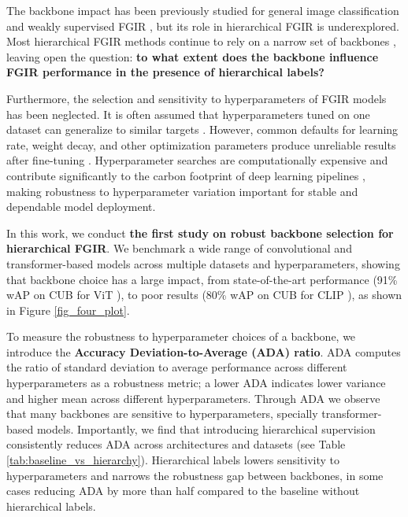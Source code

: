 \documentclass[conference]{IEEEtran}
\begin{document}


The backbone impact has been previously studied for general image classification \cite{kornblith_better_2019, goldblum_battle_2023, jeevan_which_2025} and weakly supervised FGIR \cite{ye_image_2024}, but its role in hierarchical FGIR is underexplored. Most hierarchical FGIR methods continue to rely on a narrow set of backbones \cite{wang_multiple_2015, cerri_reduction_2016, chen_fine-grained_2018, chang_your_2021, chen_label_2022, chen_hierarchically_2024}, leaving open the question: \textbf{to what extent does the backbone influence FGIR performance in the presence of hierarchical labels?}

Furthermore, the selection and sensitivity to hyperparameters of FGIR models has been neglected. It is often assumed that hyperparameters tuned on one dataset can generalize to similar targets \cite{ngiam_domain_2018}. However, common defaults for learning rate, weight decay, and other optimization parameters produce unreliable results after fine-tuning \cite{li_rethinking_2020}. Hyperparameter searches are computationally expensive and contribute significantly to the carbon footprint of deep learning pipelines \cite{strubell_energy_2019, lacoste_quantifying_2019}, making robustness to hyperparameter variation important for stable and dependable model deployment.

In this work, we conduct \textbf{the first study on robust backbone selection for hierarchical FGIR}. We benchmark a wide range of convolutional and transformer-based models across multiple datasets and hyperparameters, showing that backbone choice has a large impact, from state-of-the-art performance (91\% wAP on CUB for ViT \cite{dosovitskiy_image_2021}), to poor results (80\% wAP on CUB for CLIP \cite{cherti_reproducible_2023}), as shown in Figure \ref{fig_four_plot}. 

To measure the robustness to hyperparameter choices of a backbone, we introduce the \textbf{Accuracy Deviation-to-Average (ADA) ratio}. ADA computes the ratio of standard deviation to average performance across different hyperparameters as a robustness metric; a lower ADA indicates lower variance and higher mean across different hyperparameters. Through ADA we observe that many backbones are sensitive to hyperparameters, specially transformer-based models. Importantly, we find that introducing hierarchical supervision consistently reduces ADA across architectures and datasets (see Table \ref{tab:baseline_vs_hierarchy}). Hierarchical labels lowers sensitivity to hyperparameters and narrows the robustness gap between backbones, in some cases reducing ADA by more than half compared to the baseline without hierarchical labels.
\end{document}
